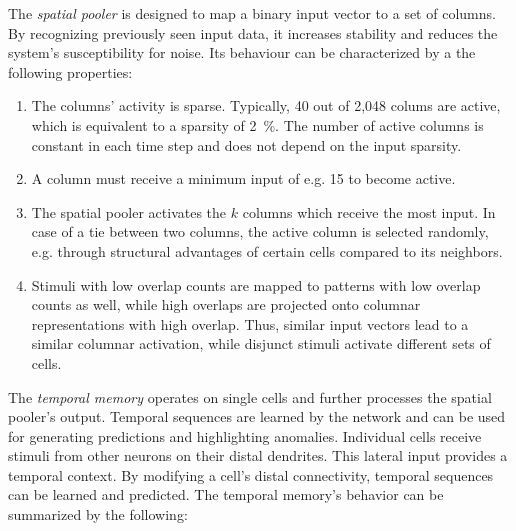\label{sec:spatial_pooler_properties}

The \emph{spatial pooler} is designed to map a binary input vector to a set of columns. By recognizing previously seen input data, it increases stability and reduces the system's susceptibility for noise. Its behaviour can be characterized by a the following properties:

\begin{enumerate}
	\item\label{enm:spatial_pooler_sparsity} The columns' activity is sparse. Typically, 40 out of 2,048 colums are active, which is equivalent to a sparsity of \SI{2}{\%}. The number of active columns is constant in each time step and does not depend on the input sparsity.
	\item\label{enm:spatial_pooler_minimum} A column must receive a minimum input of e.g. 15 to become active.
	\item\label{enm:spatial_pooler_selection} The spatial pooler activates the $k$ columns which receive the most input. In case of a tie between two columns, the active column is selected randomly, e.g. through structural advantages of certain cells compared to its neighbors.
	\item\label{enm:spatial_pooler_overlap} Stimuli with low overlap counts are mapped to patterns with low overlap counts as well, while high overlaps are projected onto columnar representations with high overlap. Thus, similar input vectors lead to a similar columnar activation, while disjunct stimuli activate different sets of cells.
\end{enumerate}


The \emph{temporal memory} operates on single cells and further processes the spatial pooler's output. Temporal sequences are learned by the network and can be used for generating predictions and highlighting anomalies. Individual cells receive stimuli from other neurons on their distal dendrites. This lateral input provides a temporal context. By modifying a cell's distal connectivity, temporal sequences can be learned and predicted. The temporal memory's behavior can be summarized by the following:

